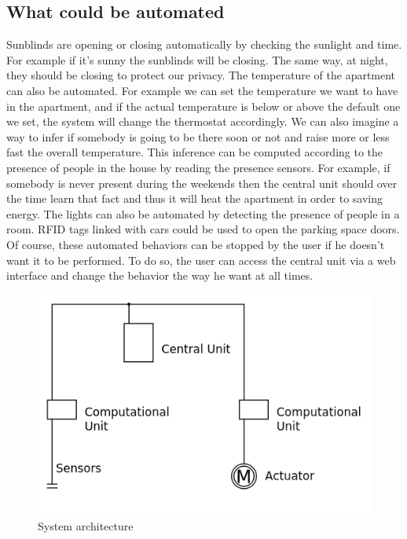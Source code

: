 \documentclass{acm_proc_article-sp}
\begin{document}
\subsection{What could be automated}
Sunblinds are opening or closing automatically by checking the sunlight and time. 
For example if it's sunny the sunblinds will be closing. The same way, at night, they should be closing to protect our privacy.
The temperature of the apartment can also be automated. For example we can set the temperature we want to have in the apartment, 
and if the actual temperature is below or above the default one we set, the system will change the thermostat accordingly. 
We can also imagine a way to infer if somebody is going to be there soon or not and raise more or less fast the overall temperature. 
This inference can be computed according to the presence of people in the house by reading the presence sensors. 
For example, if somebody is never present during the weekends then the central unit should over the time learn that fact and thus it will heat the apartment in order to saving energy.
The lights can also be automated by detecting the presence of people in a room.
RFID tags linked with cars could be used to open the parking space doors.
Of course, these automated behaviors can be stopped by the user if he doesn't want it to be performed. 
To do so, the user can access the central unit via a web interface and change the behavior the way he want at all times.
				\begin{figure}[htb]
  				\begin{center}
    				\includegraphics[width=\linewidth]{architecture}
    				\caption{System architecture \label{architecture}}
  				\end{center}
				\end{figure}
\end{document}
